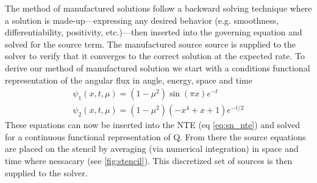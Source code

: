 The method of manufactured solutions follow a backward solving technique where a solution is made-up---expressing any desired behavior (e.g. smoothness, differentiability, positivity, etc.)---then inserted into the governing equation and solved for the source term.
The manufactured source source is supplied to the solver to verify that it converges to the correct solution at the expected rate.
To derive our method of manufactured solution we start with a conditions functional representation of the angular flux in angle, energy, space and time
\begin{subequations}
    \label{eq:manufactured_sol}
    \begin{align}
        \psi_1(x,t,\mu) = (1-\mu^2)\sin(\pi x)e^{-t} \label{eq:af_mms_cont1}\\
        \psi_2(x,t,\mu) = (1-\mu^2)(-x^4 + x + 1)e^{-t/2} \label{eq:af_mms_cont2}
    \end{align}
\end{subequations}
These equations can now be inserted into the NTE (eq \ref{eq:sn_nte}) and solved for a continuous functional representation of Q.
From there the source equations are placed on the stencil by averaging (via numerical integration) in space and time where nessacary (see \ref{fig:stencil}).
This discretized set of sources is then supplied to the solver.
